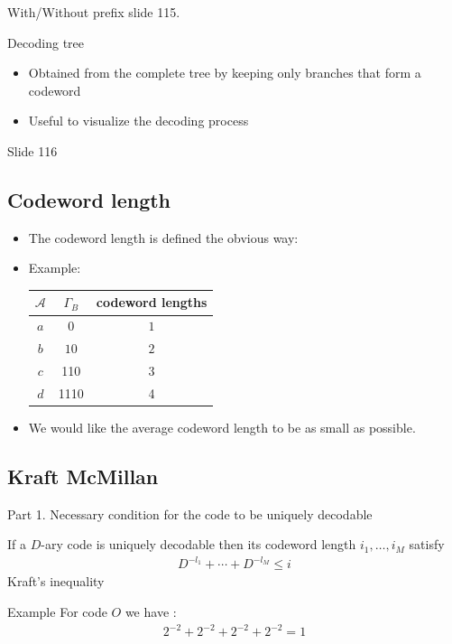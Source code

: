 \begin{parag}{With/Without prefix}
slide 115.
\end{parag}

\begin{parag}{Decoding tree}
    \begin{itemize}
        \item Obtained from the complete tree by keeping only branches that form a codeword
        \item Useful to visualize the decoding process
    \end{itemize}
    Slide 116
\end{parag}

\subsection{Codeword length}
    \begin{itemize}
        \item The codeword length is defined the obvious way:
        \item Example: 
            \begin{center}
            \begin{tabular}{|c|c|c|}
            \hline
                $ \mathcal{A}$ & $ \Gamma_B$ & codeword lengths \\
            \hline
            \hline
                $a$ & $0$ & $1$ \\
            \hline
                $b$ & $10$ & $2$ \\ 
            \hline
                $c$ & 110 & 3 \\
            \hline
                $d$ & 1110 & 4
            \hline
             \end{tabular}
            \end{center}
         \item We would like the average codeword length to be as small as possible.
    \end{itemize}
\subsection{Kraft McMillan}
\begin{parag}{Part 1. Necessary condition for the code to be uniquely decodable}
    \begin{theoreme}
        If a $D$-ary code is uniquely decodable then its codeword length $i_1, \dots, i_M$ satisfy
        \begin{align*}
            D^{-l_1} + \cdots  + D^{-l_M} \leq i 
        \end{align*}
        Kraft's inequality
    \end{theoreme}
  \begin{subparag}{Example}
        For code $O$ we have : 
        \begin{align*}
            2^{-2} + 2^{-2} + 2^{-2} + 2^{-2} = 1
        \end{align*}
        
  \end{subparag}

\end{parag}

